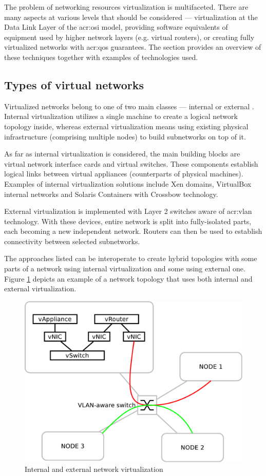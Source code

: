\documentclass[11pt,openany]{book}
\begin{document}
      The problem of networking resources virtualization is multifaceted. There are many aspects at various levels that
      should be considered --- virtualization at the Data Link Layer of the \gls{acr:osi} model, providing software
      equivalents of equipment used by higher network layers (e.g. virtual routers), or creating fully virtualized
      networks with \gls{acr:qos} guarantees. The section provides an overview of these techniques together with
      examples of technologies used.


      \subsection{Types of virtual networks}

        Virtualized networks belong to one of two main classes --- internal or external \cite{nsag}. Internal
        virtualization utilizes a single machine to create a logical network topology inside, whereas external
        virtualization means using existing physical infrastructure (comprising multiple nodes) to build subnetworks on
        top of it.

        As far as internal virtualization is considered, the main building blocks are virtual network interface cards
        and virtual switches. These components establish logical links between virtual appliances (counterparts of
        physical machines). Examples of internal virtualization solutions include Xen domains, VirtualBox internal
        networks \cite{vboxum} and Solaris Containers with Crossbow technology.

        External virtualization is implemented with Layer 2 switches aware of \gls{acr:vlan} technology. With these
        devices, entire network is split into fully-isolated parts, each becoming a new independent network. Routers can
        then be used to establish connectivity between selected subnetworks.

        The approaches listed can be interoperate to create hybrid topologies with some parts of a network using
        internal virtualization and some using external one. Figure \ref{fig:ctx:nvtypes} depicts an example of a
        network topology that uses both internal and external virtualization.
        
        \begin{figure}[H]
          \centering
          \includegraphics[width=.5\textwidth]{img/ctx/vnet-types.pdf}

          \caption{Internal and external network virtualization}
          \label{fig:ctx:nvtypes}
        \end{figure}
\end{document}
